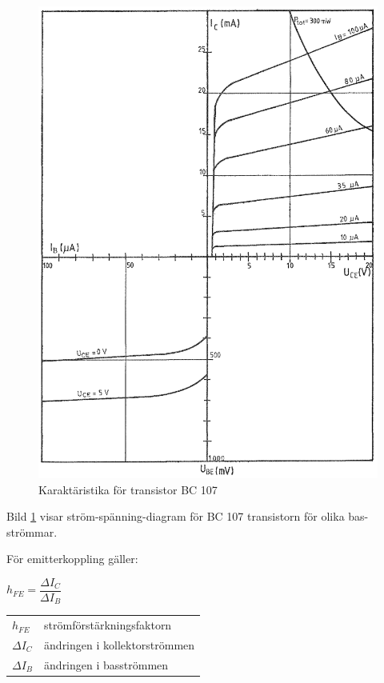 \begin{figure}
\includegraphics[width=\textwidth]{images/cropped_pdfs/bild_2_2-19.pdf}
\caption{Karaktäristika för transistor BC 107}
\label{fig:BildII2-19}
\end{figure}

Bild \ref{fig:BildII2-19} visar ström-spänning-diagram för BC 107 transistorn
för olika bas-strömmar.

För emitterkoppling gäller:

\(h_{FE} = \dfrac{\Delta I_C}{\Delta I_B}\)

\begin{tabular}{ll}
  \(h_{FE}\) & strömförstärkningsfaktorn \\
  \(\Delta I_C\)   & ändringen i kollektorströmmen \\
  \(\Delta I_B\)   & ändringen i basströmmen \\
\end{tabular}

